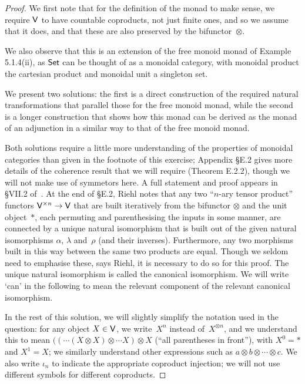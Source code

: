 \documentclass[../../solutions]{subfiles}
\begin{document}
\begin{proof}
  We first note that for the definition of the monad to make sense, we
  require ${\mathsf{V}}$ to have countable coproducts, not just finite ones,
  and so we assume that it does, and that these are also preserved by
  the bifunctor~$\otimes$.

  We also observe that this is an extension of the free monoid monad
  of Example 5.1.4(ii), as $\mathsf{Set}$ can be thought of as a monoidal
  category, with monoidal product the cartesian product and monoidal
  unit a singleton set.

  We present two solutions: the first is a direct construction of the
  required natural transformations that parallel those for the free
  monoid monad, while the second is a longer construction that shows
  how this monad can be derived as the monad of an adjunction in a
  similar way to that of the free monoid monad.

  Both solutions require a little more understanding of the properties
  of monoidal categories than given in the footnote of this exercise;
  Appendix \S E.2 gives more details of the coherence result that we
  will require (Theorem E.2.2), though we will not make use of
  symmetors here.  A full statement and proof appears in \S VII.2
  of~\cite{catworking}.  At the end of \S E.2, Riehl notes that any
  two ``$n$-ary tensor product'' functors ${\mathsf{V}}^{\times n}\to {\mathsf{V}}$ that
  are built iteratively from the bifunctor $\otimes$ and the unit
  object~$*$, each permuting and parenthesising the inputs in some
  manner, are connected by a unique natural isomorphism that is built
  out of the given natural isomorphisms $\alpha$, $\lambda$ and~$\rho$
  (and their inverses).  Furthermore, any two morphisms built in this
  way between the same two products are equal.  Though we seldom need
  to emphasise these, says Riehl, it is necessary to do so for this
  proof.  The unique natural isomorphism is called the canonical
  isomorphism.  We will write `can' in the following to mean the
  relevant component of the relevant canonical isomorphism.

  In the rest of this solution, we will slightly simplify the notation
  used in the question: for any object $X\in{\mathsf{V}}$, we write~$X^n$
  instead of~$X^{\otimes n}$, and we understand this to mean
  $((\cdots(X\otimes X)\otimes\cdots X)\otimes X$ (``all parentheses
  in front''), with $X^0={*}$ and $X^1=X$; we similarly understand
  other expressions such as $a\otimes b\otimes \cdots \otimes c$.  We
  also write $\iota_n$ to indicate the appropriate coproduct
  injection; we will not use different symbols for different
  coproducts.  \renewcommand{\qedsymbol}{}
\end{proof}
\end{document}
